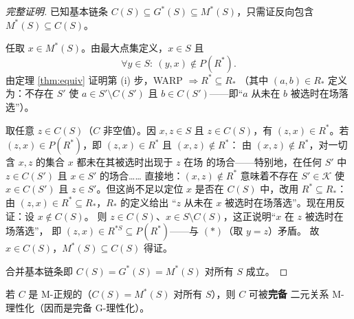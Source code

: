 \begin{proof}[完整证明]
已知基本链条 $C(S)\subseteq G^*(S)\subseteq M^*(S)$，只需证反向包含
$M^*(S)\subseteq C(S)$。

任取 $x\in M^*(S)$。由最大点集定义，$x\in S$ 且
\begin{equation}
\forall y\in S:\ (y,x)\notin P(R^*). \tag{$\ast$}
\end{equation}
由定理 \ref{thm:equiv} 证明第 (i) 步，WARP $\Rightarrow R^*\subseteq R_*$
（其中 $(a,b)\in R_*$ 定义为：不存在 $S'$ 使 $a\in S'\setminus C(S')$ 且
$b\in C(S')$——即“$a$ 从未在 $b$ 被选时在场落选”）。

取任意 $z\in C(S)$（$C$ 非空值）。因 $x,z\in S$ 且 $z\in C(S)$，有
$(z,x)\in R^*$。若 $(z,x)\in P(R^*)$，即 $(z,x)\in R^*$ 且 $(x,z)\notin R^*$：
由 $(x,z)\notin R^*$，对一切含 $x,z$ 的集合 $x$ 都未在其被选时出现于 $z$ 在场
的场合——特别地，在任何 $S'$ 中 $z\in C(S')$ 且 $x\in S'$ 的场合……
直接地：$(x,z)\notin R^*$ 意味着不存在 $S'\in\mathcal{K}$ 使 $x\in C(S')$ 且
$z\in S'$。但这尚不足以定位 $x$ 是否在 $C(S)$ 中，改用 $R^*\subseteq R_*$：
由 $(z,x)\in R^*\subseteq R_*$，$R_*$ 的定义给出
“$z$ 从未在 $x$ 被选时在场落选”。现在用反证：设 $x\notin C(S)$。
则 $z\in C(S)$、$x\in S\setminus C(S)$，这正说明“$x$ 在 $z$ 被选时在场落选”，
即 $(z,x)\in R^{*S}\subseteq P(R^*)$——与 $(\ast)$（取 $y=z$）矛盾。
故 $x\in C(S)$，$M^*(S)\subseteq C(S)$ 得证。

合并基本链条即 $C(S)=G^*(S)=M^*(S)$ 对所有 $S$ 成立。
\end{proof}

\begin{theorem}\label{thm:15}
若 $C$ 是 M-正规的（$C(S)=M^*(S)$ 对所有 $S$），则 $C$ 可被\textbf{完备}
二元关系 M-理性化（因而是完备 G-理性化）。
\end{theorem}

